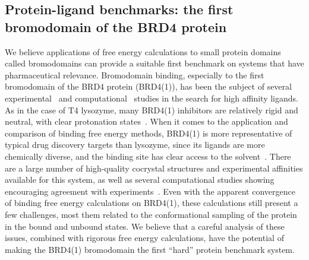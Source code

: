 \documentclass[aps,pre,twocolumn,nofootinbib,superscriptaddress,10pt, final,tightenlines]{revtex4-1}
\begin{document}
\subsection{Protein-ligand benchmarks: the first bromodomain of the BRD4 protein}
\label{sec:t5}


We believe applications of free energy calculations to small protein domains called bromodomains can provide a suitable first benchmark on systems that have pharmaceutical relevance. 
Bromodomain binding, especially to the first bromodomain of the BRD4 protein (BRD4(1)), has been the subject of several experimental~\cite{Zhang:2013:J.Med.Chem.,Bamborough:2015:J.Med.Chem., Ran:2015:J.Med.Chem., Gosmini:2014:J.Med.Chem., Chung:2011:J.Med.Chem., Xue:2016:J.Med.Chem., Fill:2012:Bioorg.Med.Chem., Fish:2012:J.Med.Chem.} and computational~\cite{Deepak:2017:Chem.Biol.Drug.Des., Dickson:2016:J.Chem.Phys., Raj:2016:J.Biomol.Struct.Dyn., Ran:2015:Mol.Biosyst., Zhao:2014:Bioorg.Med.Chem.Lett, Xu:2016:J.Med.Chem., Yang:2016:BioorganicChemistry} studies in the search for high affinity ligands. 
As in the case of T4 lysozyme, many BRD4(1) inhibitors are relatively rigid and neutral, with clear protonation states~\cite{Filippa:2014:Nat.Rev.DrugDiscov.}. 
When it comes to the application and comparison of binding free energy methods, BRD4(1) is more representative of typical drug discovery targets than lysozyme, since its ligands are more chemically diverse, and the binding site has clear access to the solvent~\cite{Filippa:2014:Nat.Rev.DrugDiscov., Fill:2012:Bioorg.Med.Chem., Xue:2016:J.Med.Chem.}. 
There are a large number of high-quality cocrystal structures and experimental affinities available for this system, as well as several computational studies showing encouraging agreement with experiments~\cite{aldeghi_accurate_2016,Aldeghi:2017:J.Am.Chem.Soc.,Heinzelmann:2017:J.Chem.TheoryComput.}. 
Even with the apparent convergence of binding free energy calculations on BRD4(1), these calculations still present a few challenges, most them related to the conformational sampling of the protein in the bound and unbound states. 
We believe that a careful analysis of these issues, combined with rigorous free energy calculations, have the potential of making the BRD4(1) bromodomain the first ``hard'' protein benchmark system.
\end{document}
